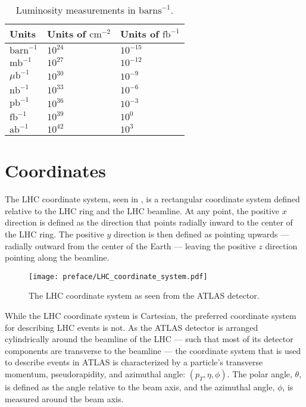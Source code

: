 \begin{table}[htpb]
 \centering
 \caption{Luminosity measurements in $\text{barns}^{-1}$.}
 \begin{tabular}{@{}lll@{}} \toprule
  Units                & Units of $\textrm{cm}^{-2}$ & Units of $\textrm{fb}^{-1}$ \\ \midrule
  $\textrm{barn}^{-1}$ & $10^{24}$                   & $10^{-15}$                  \\
  $\textrm{mb}^{-1}$   & $10^{27}$                   & $10^{-12}$                  \\
  $\mu\textrm{b}^{-1}$ & $10^{30}$                   & $10^{-9}$                   \\
  $\textrm{nb}^{-1}$   & $10^{33}$                   & $10^{-6}$                   \\
  $\textrm{pb}^{-1}$   & $10^{36}$                   & $10^{-3}$                   \\
  $\textrm{fb}^{-1}$   & $10^{39}$                   & $10^{0}$                    \\
  $\textrm{ab}^{-1}$   & $10^{42}$                   & $10^{3}$                    \\
  \bottomrule
 \end{tabular}\label{table:Luminosity}%
\end{table}

\clearpage
\section{Coordinates}\label{section:coordinates}

The LHC coordinate system, seen in , is a rectangular coordinate system defined relative to the LHC ring and the LHC beamline.
At any point, the positive $x$ direction is defined as the direction that points radially inward to the center of the LHC ring.
The positive $y$ direction is then defined as pointing upwards --- radially outward from the center of the Earth --- leaving the positive $z$ direction pointing along the beamline.

\begin{figure}[htbp]
 \centering
 \texttt{[image: preface/LHC\_coordinate\_system.pdf]}
 \caption{The LHC coordinate system as seen from the ATLAS detector.}
 \label{fig:LHC_coordinate_system}
\end{figure}

While the LHC coordinate system is Cartesian, the preferred coordinate system for describing LHC events is not.
As the ATLAS detector is arranged cylindrically around the beamline of the LHC --- such that most of its detector components are transverse to the beamline --- the coordinate system that is used to describe events in ATLAS is characterized by a particle's transverse momentum, pseudorapidity, and azimuthal angle: $\left(p_T, \eta, \phi\right)$.
The polar angle, $\theta$, is defined as the angle relative to the beam axis, and the azimuthal angle, $\phi$, is measured around the beam axis.

